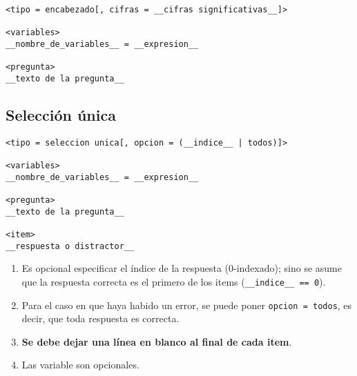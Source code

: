 \documentclass[12pt]{article}
\theoremstyle{definition}
\begin{document}
\begin{verbatim}
<tipo = encabezado[, cifras = __cifras significativas__]>

<variables>
__nombre_de_variables__ = __expresion__

<pregunta>
__texto de la pregunta__
\end{verbatim}

\subsection{Selección única}

\begin{verbatim}
<tipo = seleccion unica[, opcion = (__indice__ | todos)]>

<variables>
__nombre_de_variables__ = __expresion__

<pregunta>
__texto de la pregunta__

<item>
__respuesta o distractor__

\end{verbatim}

\begin{enumerate}
  \item Es opcional especificar el índice de la respuesta (0-indexado); sino se asume que la respuesta correcta es el primero de los items (\verb|__indice__ == 0|).
  \item Para el caso en que haya habido un error, se puede poner \verb|opcion = todos|, es decir, que toda respuesta es correcta.
  \item \textbf{Se debe dejar una línea en blanco al final de cada item}.
  \item Las variable son opcionales.
\end{enumerate}


\end{document}
